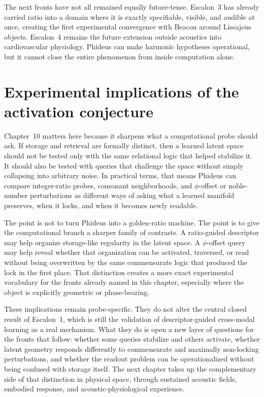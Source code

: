 The next fronts have not all remained equally future-tense. Escalon~3 has already carried ratio into a domain where it is exactly specifiable, visible, and audible at once, creating the first experimental convergence with Beacon around Lissajous objects. Escalon~4 remains the future extension outside acoustics into cardiovascular physiology. Phideus can make harmonic hypotheses operational, but it cannot close the entire phenomenon from inside computation alone.


\section{Experimental implications of the activation conjecture}

Chapter~10 matters here because it sharpens what a computational probe should ask. If storage and retrieval are formally distinct, then a learned latent space should not be tested only with the same relational logic that helped stabilize it. It should also be tested with queries that challenge the space without simply collapsing into arbitrary noise. In practical terms, that means Phideus can compare integer-ratio probes, consonant neighborhoods, and $\phi$-offset or noble-number perturbations as different ways of asking what a learned manifold preserves, when it locks, and when it becomes newly readable.

The point is not to turn Phideus into a golden-ratio machine. The point is to give the computational branch a sharper family of contrasts. A ratio-guided descriptor may help organize storage-like regularity in the latent space. A $\phi$-offset query may help reveal whether that organization can be activated, traversed, or read without being overwritten by the same commensurate logic that produced the lock in the first place. That distinction creates a more exact experimental vocabulary for the fronts already named in this chapter, especially where the object is explicitly geometric or phase-bearing.

These implications remain probe-specific. They do not alter the central closed result of Escalon~1, which is still the validation of descriptor-guided cross-modal learning as a real mechanism. What they do is open a new layer of questions for the fronts that follow: whether some queries stabilize and others activate, whether latent geometry responds differently to commensurate and maximally non-locking perturbations, and whether the readout problem can be operationalized without being confused with storage itself. The next chapter takes up the complementary side of that distinction in physical space, through sustained acoustic fields, embodied response, and acoustic-physiological experience.
